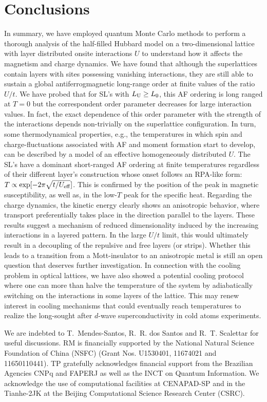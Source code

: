 \documentclass[aps,pra,reprint,twocolumn,showpacs,longbibliography,superscriptaddress]{revtex4-1}
\begin{document}
\section{Conclusions}
\label{sec:concl}
In summary, we have employed quantum Monte Carlo methods to perform a thorough analysis of the half-filled Hubbard model on a two-dimensional lattice with layer distributed onsite interactions $U$ to understand how it affects the magnetism and charge dynamics. We have found that although the superlattices contain layers with sites possessing vanishing interactions, they are still able to sustain a global antiferrogmagnetic long-range order at finite values of the ratio $U/t$. We have probed that for SL's with $L_{\rm U}\geq L_0$, this AF ordering is long ranged at $T=0$ but the correspondent order parameter decreases for large interaction values. In fact, the exact dependence of this order parameter with the strength of the interactions depends non-trivially on the superlattice configuration. In turn, some thermodynamical properties, e.g., the temperatures in which spin and charge-fluctuations associated with AF and moment formation start to develop, can be described by a model of an effective homogeneously distributed $U$. The SL's have a dominant short-ranged AF ordering at finite temperatures regardless of their different layer's construction whose onset follows an RPA-like form: $T \propto \exp[-2\pi \sqrt{t/U_{\rm eff}}]$. This is confirmed by the position of the peak in magnetic susceptibility, as well as, in the low-$T$ peak for the specific heat. Regarding the charge dynamics, the kinetic energy clearly shows an anisotropic behavior, where transport preferentially takes place in the direction parallel to the layers. These results suggest a mechanism of reduced dimensionality induced by the increasing interactions in a layered pattern. In the large $U/t$ limit, this would ultimately result in a decoupling of the repulsive and free layers (or strips). Whether this leads to a transition from a Mott-insulator to an anisotropic metal is still an open question %
that deserves further investigation. In connection with the cooling problem in optical lattices, we have also showed a potential cooling protocol where one can more than halve the temperature of the system by adiabatically switching on the interactions in some layers of the lattice. This may renew interest in cooling mechanisms that could eventually reach temperatures to realize the long-sought after $d$-wave superconductivity in cold atoms experiments.

\begin{acknowledgments}
We are indebted to T.~Mendes-Santos, R.~R. dos Santos and R.~T. Scalettar for useful discussions.
RM is financially supported by the National Natural Science Foundation of China (NSFC) (Grant Nos. U1530401, 11674021 and 11650110441). TP gratefully acknowledges financial support from the Brazilian Agencies CNPq and  FAPERJ as well as the  INCT on Quantum Information. We acknowledge the use of computational facilities at CENAPAD-SP and in the Tianhe-2JK at the Beijing Computational Science Research Center (CSRC).
\end{acknowledgments}


\end{document}
